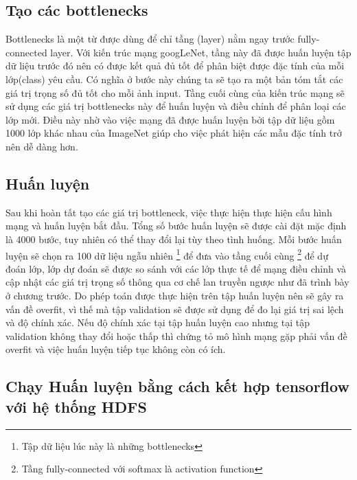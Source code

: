 	\subsection{Tạo các bottlenecks}
	
	Bottlenecks\cite{bottlenecks} là một từ được dùng để chỉ tầng (layer) nằm ngay trước fully-connected layer. Với kiến trúc mạng googLeNet, tầng này đã được huấn luyện tập dữ liệu trước đó nên có được kết quả đủ tốt để phân biệt được đặc tính của mỗi lớp(class) yêu cầu. Có nghĩa ở bước này chúng ta sẽ tạo ra một bản tóm tắt các giá trị trọng số đủ tốt cho mỗi ảnh input. Tầng cuối cùng của kiến trúc mạng sẽ sử dụng các giá trị bottlenecks này để huấn luyện và điều chỉnh để phân loại các lớp mới. Điều này nhờ vào việc mạng đã được huấn luyện bởi tập dữ liệu gồm 1000 lớp khác nhau của ImageNet giúp cho việc phát hiện các mẫu đặc tính trở nên dễ dàng hơn.
	
	\subsection{Huấn luyện}
		
	Sau khi hoàn tất tạo các giá trị bottleneck, việc thực hiện thực hiện cấu hình mạng và huấn luyện bắt đầu. Tổng số bước huấn luyện sẽ được cài đặt mặc định là 4000 bước, tuy nhiên có thể thay đổi lại tùy theo tình huống. Mỗi bước huấn luyện sẽ chọn ra 100 dữ liệu ngẫu nhiên \footnote{Tập dữ liệu lúc này là những bottlenecks} để đưa vào tầng cuối cùng \footnote{Tầng fully-connected với softmax là activation function} để dự đoán lớp, lớp dự đoán sẽ được so sánh với các lớp thực tế để mạng điều chỉnh và cập nhật các giá trị trọng số thông qua cơ chế lan truyền ngược như đã trình bày ở chương trước. Do phép toán được thực hiện trên tập huấn luyện nên sẽ  gây ra vấn đề overfit, vì thế mà tập validation sẽ được sử dụng để đo lại giá trị sai lệch và độ chính xác. Nếu độ chính xác tại tập huấn luyện cao nhưng tại tập validation không thay đổi hoặc thấp thì chứng tỏ mô hình mạng gặp phải vấn đề overfit và việc huấn luyện tiếp tục không còn có ích.
	
	\subsection{Chạy Huấn luyện bằng cách kết hợp tensorflow với hệ thống HDFS}
